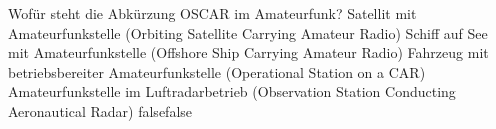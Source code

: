     {Wofür steht die Abkürzung OSCAR im Amateurfunk?}
    {Satellit mit Amateurfunkstelle (Orbiting Satellite Carrying Amateur Radio)}
    {Schiff auf See mit Amateurfunkstelle (Offshore Ship Carrying Amateur Radio)}
    {Fahrzeug mit betriebsbereiter Amateurfunkstelle (Operational Station on a CAR)}
    {Amateurfunkstelle im Luftradarbetrieb (Observation Station Conducting Aeronautical Radar)}
    {false}{false}
